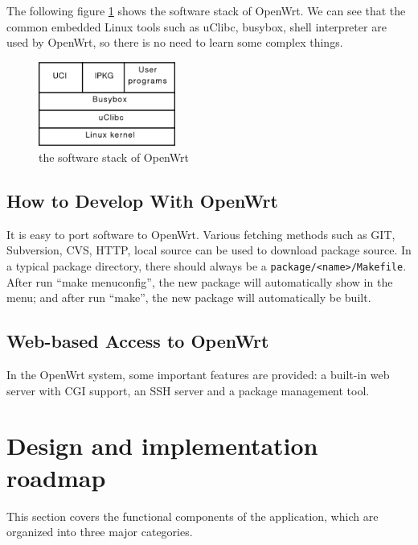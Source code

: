 \documentclass{sig-alternate-05-2015}
\begin{document}
The following figure \ref{OpenWrt:stack} shows the software stack of OpenWrt. We can see that the common embedded Linux tools such as uClibc, busybox, shell interpreter are used by OpenWrt, so there is no need to learn some complex things.

\begin{figure}
	\centering
	\includegraphics[width=0.4\textwidth]{stack.png}
	\caption{the software stack of OpenWrt}
	\label{OpenWrt:stack}
\end{figure}

\subsection{How to Develop With OpenWrt}

It is easy to port software to OpenWrt. Various fetching methods such as GIT, Subversion, CVS, HTTP, local source can be used to download package source. In a typical package directory, there should always be a \verb|package/<name>/Makefile|. After run ``make menuconfig'', the new package will automatically show in the menu; and after run ``make'', the new package will automatically be built.

\subsection{Web-based Access to OpenWrt}
In the OpenWrt system, some important features are provided: a built-in web server with CGI support, an SSH server and a package management tool.

\section{Design and implementation \\ roadmap}

This section covers the functional components of the application, which are organized into three major categories.
\end{document}
